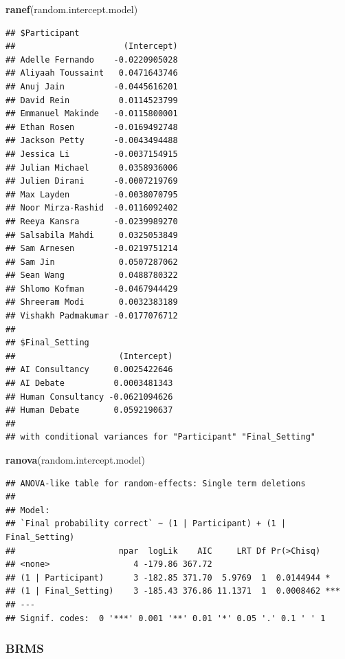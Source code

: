 \documentclass[
]{article}
\newenvironment{Shaded}{\begin{snugshade}}{\end{snugshade}}
\newcommand{\FunctionTok}[1]{\textcolor[rgb]{0.13,0.29,0.53}{\textbf{#1}}}
\newcommand{\NormalTok}[1]{#1}
\begin{document}
\begin{Shaded}
\begin{Highlighting}[]
\FunctionTok{ranef}\NormalTok{(random.intercept.model)}
\end{Highlighting}
\end{Shaded}

\begin{verbatim}
## $Participant
##                      (Intercept)
## Adelle Fernando    -0.0220905028
## Aliyaah Toussaint   0.0471643746
## Anuj Jain          -0.0445616201
## David Rein          0.0114523799
## Emmanuel Makinde   -0.0115800001
## Ethan Rosen        -0.0169492748
## Jackson Petty      -0.0043494488
## Jessica Li         -0.0037154915
## Julian Michael      0.0358936006
## Julien Dirani      -0.0007219769
## Max Layden         -0.0038070795
## Noor Mirza-Rashid  -0.0116092402
## Reeya Kansra       -0.0239989270
## Salsabila Mahdi     0.0325053849
## Sam Arnesen        -0.0219751214
## Sam Jin             0.0507287062
## Sean Wang           0.0488780322
## Shlomo Kofman      -0.0467944429
## Shreeram Modi       0.0032383189
## Vishakh Padmakumar -0.0177076712
## 
## $Final_Setting
##                     (Intercept)
## AI Consultancy     0.0025422646
## AI Debate          0.0003481343
## Human Consultancy -0.0621094626
## Human Debate       0.0592190637
## 
## with conditional variances for "Participant" "Final_Setting"
\end{verbatim}

\begin{Shaded}
\begin{Highlighting}[]
\FunctionTok{ranova}\NormalTok{(random.intercept.model)}
\end{Highlighting}
\end{Shaded}

\begin{verbatim}
## ANOVA-like table for random-effects: Single term deletions
## 
## Model:
## `Final probability correct` ~ (1 | Participant) + (1 | Final_Setting)
##                     npar  logLik    AIC     LRT Df Pr(>Chisq)    
## <none>                 4 -179.86 367.72                          
## (1 | Participant)      3 -182.85 371.70  5.9769  1  0.0144944 *  
## (1 | Final_Setting)    3 -185.43 376.86 11.1371  1  0.0008462 ***
## ---
## Signif. codes:  0 '***' 0.001 '**' 0.01 '*' 0.05 '.' 0.1 ' ' 1
\end{verbatim}

\subsubsection{BRMS}\label{brms}
\end{document}
